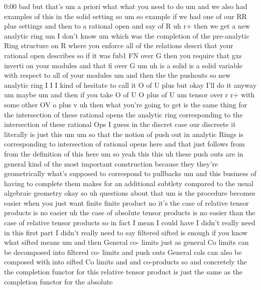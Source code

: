 \begin{unfinished}{0:00}
bad  but  that's  um  a  priori  what  what  you
need  to
do  um  and  we  also  had  examples  of  this
in  the  solid
setting
so
um  so
example  if  we  had  one  of  our  RR  plus
settings  and  then  to  a  rational  open
and  say  of  R  uh
r+  then  we  get  a  new  analytic
ring
um  I  don't  know
um  which  was  the  completion  of  the
pre-analytic  Ring  structure  on  R  where
you  enforce  all  of  the  relations  descri
that  your  rational  open  describes  so  if
it  was  fub1  FN  over  G  then  you  require
that  gxs  inverti  on  your  modules  and
that  fi  over  G
um  uh  is  a  solid  is  a  solid  variable
with  respect  to  all  of  your
modules  um  and  then  the  the  pushouts  so
new  analytic  ring  I  I  I  kind  of  hesitate
to  call  it  O  of  U  plus  but  okay  I'll  do
it  anyway
um  maybe  um  and  then  if  you  take  O  of  U
O  plus  of  U  um  tensor  over  r  r+  with
some  other  OV  o  plus
v  uh  then  what  you're  going  to  get  is
the  same  thing  for  the  intersection  of
these  rational
opens  the  analytic  ring  corresponding  to
the  intersection  of  these  rational
Ops  I  guess  in  the  discret  case  our
discreete  it  literally  is  just  this
um  um  so  that  the  notion  of  push  out  in
analytic  Rings  is  corresponding  to
intersection  of  rational  opens  here  and
that  just  follows  from  from  the
definition  of  this
here
um  so  yeah  this  this  uh  these  push  outs
are  in  general  kind  of  the  most
important  construction  because  they
they're  geometrically  what's  supposed  to
correspond  to  pullbacks
um  and  this  business  of  having  to
complete  them  makes  for  an  additional
subtlety  compared  to  the  usual  algebraic
geometry
okay
so  uh  questions  about
that
um  is  the  procedure  becomes  easier  when
you  just  want
finite  finite  product
no  it's  the  case  of  relative  tensor
products  is  no  easier  uh  the  case  of
absolute  tensor  products  is  no  easier
than  the  case  of  relative  tensor
products  so  in  fact  I  mean  I  could
have  I  didn't  really  need  in  this  first
part  I  didn't  really  need  to  say
filtered  sifted  is  enough  if  you  know
what  sifted  means  um  and  then  General
co-  limits  just  as  general  Co  limits  can
be  decomposed  into  filtered  co-  limits
and  push  outs  General  cols  can  also  be
composed  with  into  sifted  Co  limits  and
and
co-products  so  and  concretely  the  the
completion  functor  for  this  relative
tensor  product  is  just  the  same  as  the
completion  functor  for  the  absolute

\end{unfinished}

